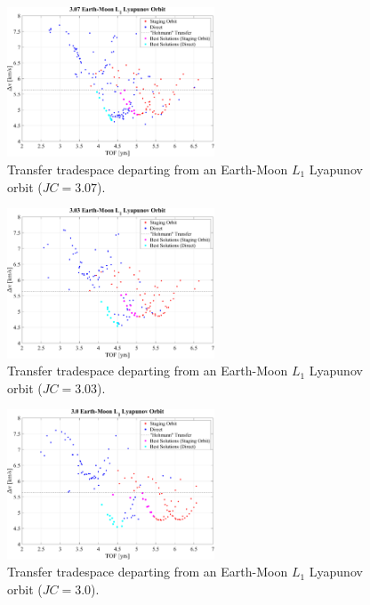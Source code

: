 \begin{figure}[ht]
    \centering
    \includegraphics[width=0.55\textwidth]{figures/TradeSpace_L1Lyapunov_3_07.pdf}
    \caption{Transfer tradespace departing from an Earth-Moon $L_{1}$ Lyapunov orbit ($JC=3.07$).}
\end{figure}

\begin{figure}[ht]
    \centering
    \includegraphics[width=0.55\textwidth]{figures/TradeSpace_L1Lyapunov_3_03.pdf}
    \caption{Transfer tradespace departing from an Earth-Moon $L_{1}$ Lyapunov orbit ($JC=3.03$).}
\end{figure}
\clearpage

\begin{figure}[ht]
    \centering
    \includegraphics[width=0.55\textwidth]{figures/TradeSpace_L1Lyapunov_3_00.pdf}
    \caption{Transfer tradespace departing from an Earth-Moon $L_{1}$ Lyapunov orbit ($JC=3.0$).}
\end{figure}


